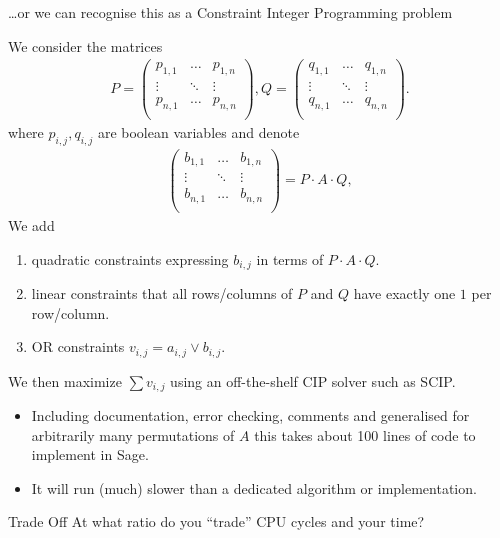 \documentclass[9pt]{beamer}
\begin{document}
\begin{frame}[allowframebreaks]
\vspace{1em}

\dots or we can recognise this as a Constraint Integer Programming problem

\framebreak

We consider the matrices
\begin{eqnarray*}
P =  \left(\begin{array}{ccc}
                p_{1,1} & \dots & p_{1,n}\\
                \vdots & \ddots & \vdots\\
                p_{n,1} & \dots & p_{n,n}\\
                \end{array}\right),
Q =  \left(\begin{array}{ccc}
                q_{1,1} &  \dots & q_{1,n}\\
                \vdots  & \ddots & \vdots\\
                q_{n,1} & \dots & q_{n,n}\\
                \end{array}\right).
\end{eqnarray*}
where $p_{i,j}, q_{i,j}$ are boolean variables and denote
\begin{eqnarray*}
\left(\begin{array}{ccc}
                b_{1,1} & \dots  & b_{1,n}\\
                \vdots  & \ddots & \vdots\\
                b_{n,1} & \dots  & b_{n,n}\\
                \end{array}\right) = P \cdot A \cdot Q,
\end{eqnarray*}
We add 
\begin{enumerate}
 \item quadratic constraints expressing $b_{i,j}$ in terms of $P\cdot A \cdot Q$.
 \item linear constraints that all rows/columns of $P$ and $Q$ have exactly one $1$ per row/column.
 \item OR constraints $v_{i,j} = a_{i,j} \vee  b_{i,j}$.
\end{enumerate}
We then maximize $\sum v_{i,j}$ using an off-the-shelf CIP solver such as SCIP.

\framebreak

\begin{itemize}
 \item Including documentation, error checking, comments and generalised for arbitrarily many permutations of $A$ this takes about 100 lines of code to implement in Sage.
 \item It will run (much) slower than a dedicated algorithm or implementation.
\end{itemize}

\vspace{2em}

\begin{block}{Trade Off}
At what ratio do you ``trade'' CPU cycles and your time?
\end{block}
\end{frame}
\end{document}
